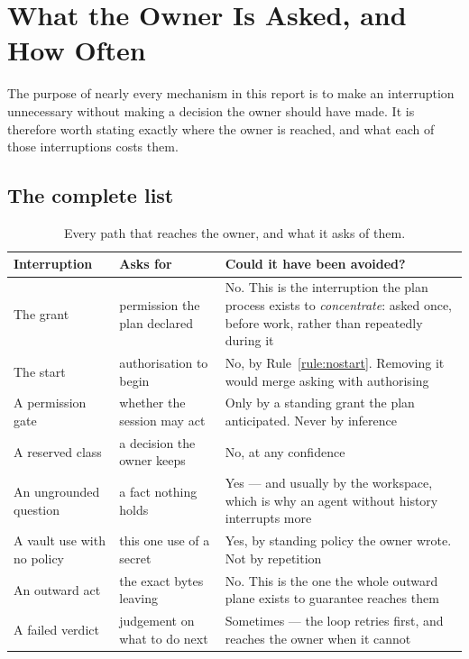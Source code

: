\documentclass[11pt]{article}
\begin{document}
\section{What the Owner Is Asked, and How Often}
\label{sec:asked}

The purpose of nearly every mechanism in this report is to make an interruption unnecessary without making a decision the owner should have made. It is therefore worth stating exactly where the owner is reached, and what each of those interruptions costs them.

\subsection{The complete list}

\begin{table}[h]
\centering\small
\caption{Every path that reaches the owner, and what it asks of them.}
\label{tab:asked}
\begin{tabular}{@{}L{3.3cm}L{4.4cm}L{5.7cm}@{}}
\toprule
\textbf{Interruption} & \textbf{Asks for} & \textbf{Could it have been avoided?} \\
\midrule
The grant & permission the plan declared & No. This is the interruption the plan process exists to \emph{concentrate}: asked once, before work, rather than repeatedly during it \\
The start & authorisation to begin & No, by Rule~\ref{rule:nostart}. Removing it would merge asking with authorising \\
A permission gate & whether the session may act & Only by a standing grant the plan anticipated. Never by inference \\
A reserved class & a decision the owner keeps & No, at any confidence \\
An ungrounded question & a fact nothing holds & Yes --- and usually by the workspace, which is why an agent without history interrupts more \\
A vault use with no policy & this one use of a secret & Yes, by standing policy the owner wrote. Not by repetition \\
An outward act & the exact bytes leaving & No. This is the one the whole outward plane exists to guarantee reaches them \\
A failed verdict & judgement on what to do next & Sometimes --- the loop retries first, and reaches the owner when it cannot \\
\bottomrule
\end{tabular}
\end{table}
\end{document}
